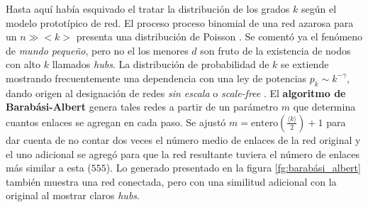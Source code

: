 \documentclass{article}
\begin{document}
Hasta aquí había esquivado el tratar la distribución de los grados $k$ según el modelo prototípico de red.
El proceso proceso binomial de una red azarosa para un $n \gg <k>$ presenta una distribución de Poisson \cite[sección 3.4]{albert-laszlo_barabasi_network_2016}.
Se comentó ya el fenómeno de \emph{mundo pequeño}, pero no el los menores $d$ son fruto de la existencia de nodos con alto $k$ llamados \emph{hubs}.
La distribución de probabilidad de $k$ se extiende mostrando frecuentemente una dependencia con una ley de potencias $p_k \sim k^{- \gamma}$, dando origen al designación de redes \emph{sin escala} o \emph{scale-free} \cite*[sección 4.2]{albert-laszlo_barabasi_network_2016}.
El \textbf{algoritmo de Barabási-Albert} genera tales redes a partir de un parámetro $m$ que determina cuantos enlaces se agregan en cada paso.
Se ajustó $m = \mathrm{entero} \left( \frac{\langle k \rangle}{2} \right) + 1$ para dar cuenta de no contar dos veces el número medio de enlaces de la red original y el uno adicional se agregó para que la red resultante tuviera el número de enlaces más similar a esta ($555$).
Lo generado presentado en la figura \ref{fg:barabási_albert} también muestra una red conectada, pero con una similitud adicional con la original al mostrar claros \emph{hubs}.  
\end{document}
